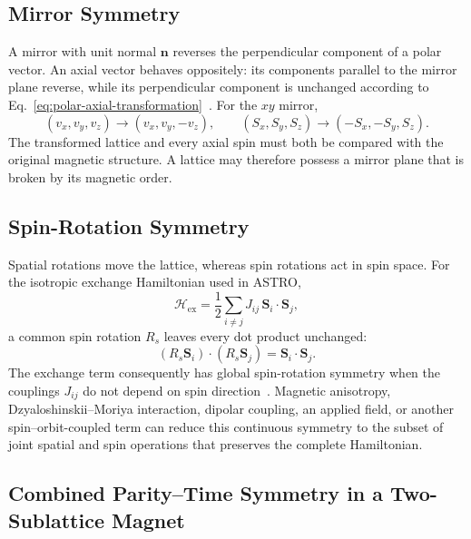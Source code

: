 \subsection{Mirror Symmetry}

A mirror with unit normal $\mathbf{n}$ reverses the perpendicular component of
a polar vector.  An axial vector behaves oppositely: its components parallel to
the mirror plane reverse, while its perpendicular component is unchanged
according to Eq.~\eqref{eq:polar-axial-transformation}~\cite{ee237-week11}.
For the $xy$ mirror,
\begin{equation}
    (v_x,v_y,v_z)\to(v_x,v_y,-v_z),
    \qquad
    (S_x,S_y,S_z)\to(-S_x,-S_y,S_z).
    \label{eq:xy-mirror-polar-axial}
\end{equation}
The transformed lattice and every axial spin must both be compared with the
original magnetic structure.  A lattice may therefore possess a mirror plane
that is broken by its magnetic order.

\subsection{Spin-Rotation Symmetry}

Spatial rotations move the lattice, whereas spin rotations act in spin space.
For the isotropic exchange Hamiltonian used in ASTRO,
\begin{equation}
    \mathcal{H}_{\mathrm{ex}}
    =\frac{1}{2}\sum_{i\ne j}J_{ij}\,\mathbf{S}_i\cdot\mathbf{S}_j,
    \label{eq:symmetry-isotropic-exchange}
\end{equation}
a common spin rotation $R_s$ leaves every dot product unchanged:
\begin{equation}
    (R_s\mathbf{S}_i)\cdot(R_s\mathbf{S}_j)
    =\mathbf{S}_i\cdot\mathbf{S}_j.
    \label{eq:global-spin-rotation}
\end{equation}
The exchange term consequently has global spin-rotation symmetry when the
couplings $J_{ij}$ do not depend on spin direction~\cite{astro-code}.  Magnetic
anisotropy, Dzyaloshinskii--Moriya interaction, dipolar coupling, an applied
field, or another spin--orbit-coupled term can reduce this continuous symmetry
to the subset of joint spatial and spin operations that preserves the complete
Hamiltonian.

\subsection{Combined Parity--Time Symmetry in a Two-Sublattice Magnet}

